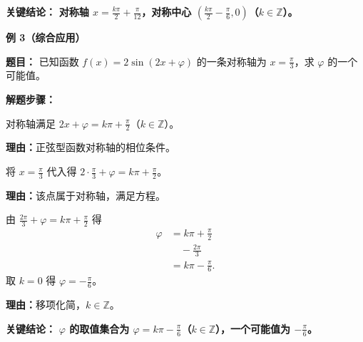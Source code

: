 \begin{examplebox}
	\textbf{\textcolor{CExample}{关键结论：}}
	\textbf{对称轴 $x = \frac{k\pi}{2} + \frac{\pi}{12}$，对称中心 $\left(\frac{k\pi}{2} - \frac{\pi}{6}, 0\right)$（$k\in\mathbb{Z}$）。}

	\medskip
	\textbf{\textcolor{CExample}{例 3（综合应用）}}

	\textbf{\textcolor{CExample}{题目：}}
	已知函数 $f(x) = 2\sin(2x + \varphi)$ 的一条对称轴为 $x = \frac{\pi}{3}$，求 $\varphi$ 的一个可能值。

	\textbf{\textcolor{CExample}{解题步骤：}}
	\begin{description}[style=nextline, leftmargin=2.8em, labelsep=0.5em, itemsep=0.45em]
		\item[\textbf{第一步（写出对称轴条件）：}] 对称轴满足 $2x + \varphi = k\pi + \frac{\pi}{2}$（$k\in\mathbb{Z}$）。
			\par\textbf{理由：}正弦型函数对称轴的相位条件。
		\item[\textbf{第二步（代入已知对称轴）：}] 将 $x = \frac{\pi}{3}$ 代入得 $2\cdot\frac{\pi}{3} + \varphi = k\pi + \frac{\pi}{2}$。
			\par\textbf{理由：}该点属于对称轴，满足方程。
		\item[\textbf{第三步（解出 $\varphi$）：}] 由 $\frac{2\pi}{3} + \varphi = k\pi + \frac{\pi}{2}$ 得
			\[
				\begin{aligned}
					\varphi &= k\pi + \frac{\pi}{2} \\
					& \quad - \frac{2\pi}{3} \\
					&= k\pi - \frac{\pi}{6}.
			\end{aligned}
			\]
			取 $k=0$ 得 $\varphi = -\frac{\pi}{6}$。
			\par\textbf{理由：}移项化简，$k\in\mathbb{Z}$。
	\end{description}

	\textbf{\textcolor{CExample}{关键结论：}}
	\textbf{$\varphi$ 的取值集合为 $\varphi = k\pi - \frac{\pi}{6}$（$k\in\mathbb{Z}$），一个可能值为 $-\frac{\pi}{6}$。}
\end{examplebox}
